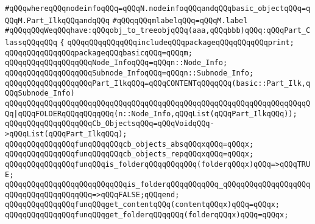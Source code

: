 \verb|#qQQqwhereqQQqnodeinfoqQQq=qQQqN.nodeinfoqQQqandqQQqbasic_objectqQQq=qQQqM.Part_IlkqQQqandqQQq|\newline
\verb|#qQQqqQQqmlabelqQQq=qQQqM.label|\newline
\newline
\verb|#qQQqqQQqWeqQQqhave:qQQqobj_to_treeobjqQQq(aaa,qQQqbbb)qQQq:qQQqPart_ClassqQQqqQQq|\newline
\newline
\verb|{|\newline
\newline
\verb|qQQqqQQqqQQqqQQqincludeqQQqpackageqQQqqQQqqQQqprint;|\newline
\newline
\verb|qQQqqQQqqQQqqQQqpackageqQQqbasicqQQq=qQQqm;|\newline
\newline
\verb|qQQqqQQqqQQqqQQqqQQqNode_InfoqQQq=qQQqn::Node_Info;|\newline
\verb|qQQqqQQqqQQqqQQqqQQqSubnode_InfoqQQq=qQQqn::Subnode_Info;|\newline
\newline
\verb|qQQqqQQqqQQqqQQqqQQqPart_IlkqQQq=qQQqCONTENTqQQqqQQq(basic::Part_Ilk,qQQqSubnode_Info)|\newline
\verb|qQQqqQQqqQQqqQQqqQQqqQQqqQQqqQQqqQQqqQQqqQQqqQQqqQQqqQQqqQQqqQQqqQQqqQQq|\verb#|qQQqFOLDERqQQqqQQqqQQq(n::Node_Info,qQQqList(qQQqPart_IlkqQQq));#\newline
\newline
\verb|qQQqqQQqqQQqqQQqqQQqCb_ObjectsqQQq=qQQqVoidqQQq->qQQqList(qQQqPart_IlkqQQq);|\newline
\newline
\verb|qQQqqQQqqQQqqQQqfunqQQqqQQqcb_objects_absqQQqxqQQq=qQQqx;|\newline
\verb|qQQqqQQqqQQqqQQqfunqQQqqQQqcb_objects_repqQQqxqQQq=qQQqx;|\newline
\newline
\verb|qQQqqQQqqQQqqQQqfunqQQqis_folderqQQqqQQqqQQq(folderqQQqx)qQQq=>qQQqTRUE;|\newline
\verb|qQQqqQQqqQQqqQQqqQQqqQQqqQQqis_folderqQQqqQQqqQQq_qQQqqQQqqQQqqQQqqQQqqQQqqQQqqQQqqQQqqQQq=>qQQqFALSE;qQQqend;|\newline
\newline
\verb|qQQqqQQqqQQqqQQqfunqQQqget_contentqQQq(contentqQQqx)qQQq=qQQqx;|\newline
\verb|qQQqqQQqqQQqqQQqfunqQQqget_folderqQQqqQQq(folderqQQqx)qQQq=qQQqx;|\newline
\newline

